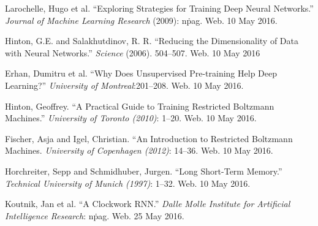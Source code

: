 \documentclass{article}
\begin{document}
\begin{thebibliography}{9}
		Larochelle, Hugo et al. ``Exploring Strategies for Training Deep Neural
		Networks.'' \textit{Journal of Machine Learning Research} (2009): n\. pag.
		Web. 10 May 2016.

		Hinton, G.E. and Salakhutdinov, R. R. ``Reducing the Dimensionality of
		Data with Neural Networks.'' \textit{Science} (2006). 504--507. Web. 10
		May 2016

		Erhan, Dumitru et al. ``Why Does Unsupervised Pre-training Help Deep
		Learning?'' \textit{University of Montreal}:201--208. Web. 10 May 2016.

		Hinton, Geoffrey. ``A Practical Guide to Training Restricted Boltzmann
		Machines.'' \textit{University of Toronto (2010)}: 1--20. Web. 10 May
		2016.

		Fischer, Asja and Igel, Christian. ``An Introduction to Restricted
		Boltzmann Machines. \textit{University of Copenhagen (2012)}: 14--36. Web.
		10 May 2016.

		Horchreiter, Sepp and Schmidhuber, Jurgen. ``Long Short-Term Memory.''
		\textit{Technical University of Munich (1997)}: 1--32. Web. 10 May 2016.

		Koutnik, Jan et al. ``A Clockwork RNN.'' \textit{Dalle Molle Institute
		for Artificial Intelligence Research}: n\. pag. Web. 25 May 2016.

\end{thebibliography}
\end{document}
